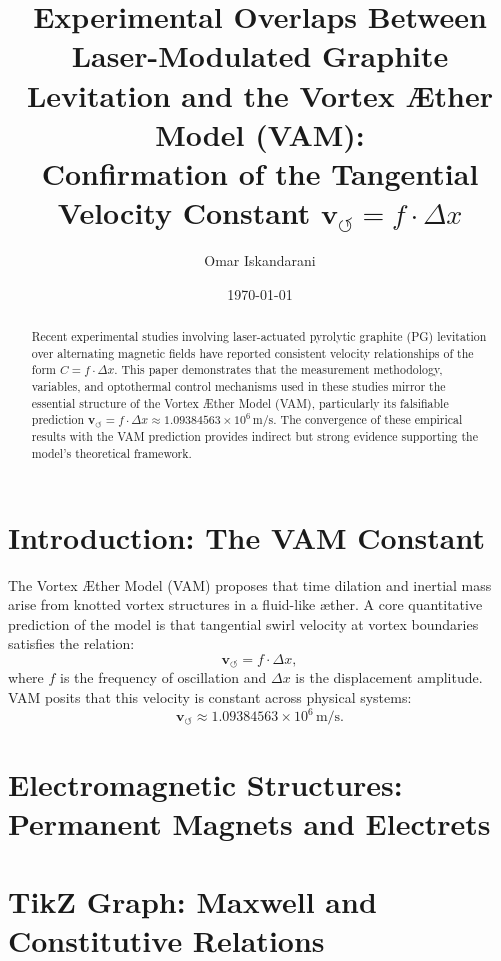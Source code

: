 \documentclass[11pt]{article}
\title{Experimental Overlaps Between Laser-Modulated Graphite Levitation and the Vortex Æther Model (VAM):\\
Confirmation of the Tangential Velocity Constant \( \mathbf{v}_{\scriptscriptstyle\boldsymbol{\circlearrowleft}} = f \cdot \Delta x \)}
\author{Omar Iskandarani}
\date{\today}
\begin{document}
\maketitle

\begin{abstract}
Recent experimental studies involving laser-actuated pyrolytic graphite (PG) levitation over alternating magnetic fields have reported consistent velocity relationships of the form \( C = f \cdot \Delta x \). This paper demonstrates that the measurement methodology, variables, and optothermal control mechanisms used in these studies mirror the essential structure of the Vortex Æther Model (VAM), particularly its falsifiable prediction \( \mathbf{v}_{\scriptscriptstyle\boldsymbol{\circlearrowleft}} = f \cdot \Delta x \approx 1.09384563 \times 10^6 \, \text{m/s} \). The convergence of these empirical results with the VAM prediction provides indirect but strong evidence supporting the model’s theoretical framework.
\end{abstract}


\section{Introduction: The VAM Constant}
The Vortex Æther Model (VAM) \cite{Iskandarani2025} proposes that time dilation and inertial mass arise from knotted vortex structures in a fluid-like æther. A core quantitative prediction of the model is that tangential swirl velocity at vortex boundaries satisfies the relation:
\[
\mathbf{v}_{\scriptscriptstyle\boldsymbol{\circlearrowleft}} = f \cdot \Delta x,
\]
where \( f \) is the frequency of oscillation and \( \Delta x \) is the displacement amplitude. VAM posits that this velocity is constant across physical systems:
\[
\mathbf{v}_{\scriptscriptstyle\boldsymbol{\circlearrowleft}} \approx 1.09384563 \times 10^6 \, \text{m/s}.
\]

\section{Electromagnetic Structures: Permanent Magnets and Electrets}

\section*{TikZ Graph: Maxwell and Constitutive Relations}
\end{document}
